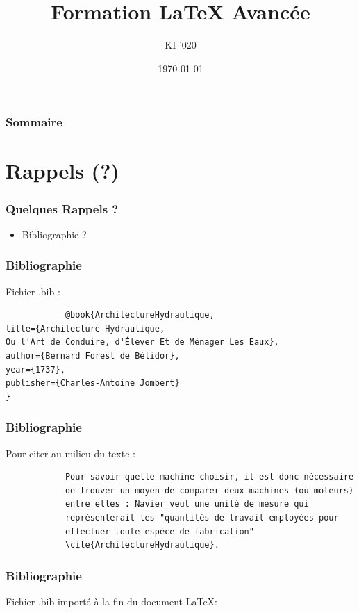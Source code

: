 \documentclass[handout]{beamer}
\title{Formation \LaTeX \vspace{0.2cm} Avancée}
\author{KI '020}
\institute{\color{white}Ecole des Ponts Paristech}
\date{\today}
\begin{document}
	\begin{frame}
		\titlepage
	\end{frame}

	\begin{frame}
		\frametitle{Sommaire}
		\setcounter{tocdepth}{1}
		\tableofcontents
	\end{frame}

\section{Rappels (?)}

	\begin{frame}
		\frametitle{Quelques Rappels ?}
		\begin{itemize}
			\item Bibliographie ?
		\end{itemize}
	\end{frame}

	\begin{frame}[fragile=singleslide]
		\frametitle{Bibliographie}

		\centering
		Fichier .bib :
		\begin{verbatim}
			@book{ArchitectureHydraulique,
title={Architecture Hydraulique,
Ou l'Art de Conduire, d'Élever Et de Ménager Les Eaux},
author={Bernard Forest de Bélidor},
year={1737},
publisher={Charles-Antoine Jombert}
}
		\end{verbatim}

	\end{frame}

	\begin{frame}[fragile=singleslide]
		\frametitle{Bibliographie}
		\centering
		Pour citer au milieu du texte :\\

		\begin{verbatim}
			Pour savoir quelle machine choisir, il est donc nécessaire
			de trouver un moyen de comparer deux machines (ou moteurs)
			entre elles : Navier veut une unité de mesure qui
			représenterait les "quantités de travail employées pour
			effectuer toute espèce de fabrication"
			\cite{ArchitectureHydraulique}.
		\end{verbatim}

	\end{frame}

	\begin{frame}[fragile=singleslide]
		\frametitle{Bibliographie}

		\centering
		Fichier .bib importé à la fin du document \LaTeX :
		\begin{verbatim}
			
			
		\end{verbatim}

	\end{frame}
\end{document}
